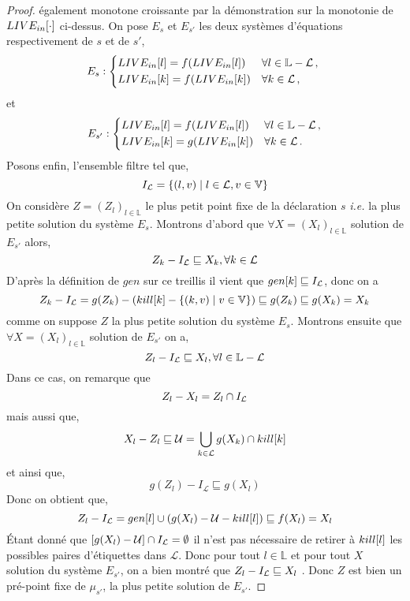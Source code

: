 \documentclass[a4paper, 12pt]{article}
\begin{document}
\begin{proof}
	également monotone croissante par la démonstration sur la monotonie de $LIVE_{in}[\cdot]$ ci-dessus.
	On pose $E_s$ et $E_{s'}$ les deux systèmes d'équations respectivement de $s$ et de $s'$,
	\[
	E_s :
	\begin{dcases*}
		\livein{l} = f(\livein{l}) &$\forall l \in \mathbb{L} - \mathcal{L}$\,, \\
		\livein{k} = f(\livein{k}) &$\forall k \in \mathcal{L}$\,,
	\end{dcases*}
	\]
	et
	\[
	E_{s'} :
	\begin{dcases*}
		\livein{l} = f(\livein{l}) &$\forall l \in \mathbb{L} - \mathcal{L}$\,,\\
		\livein{k} = g(\livein{k}) &$\forall k \in \mathcal{L}$\,.
	\end{dcases*}
	\]
	Posons enfin, l'ensemble filtre tel que,
	\[
		I_{\mathcal{L}} = \{(l, v) \mid l \in \mathcal{L}, v \in \mathbb{V}\}
	\]
	On considère $Z = (Z_l)_{l\in \mathbb{L}}$ le plus petit point fixe de la déclaration $s$ \textit{i.e.} la plus petite solution du système $E_s$.
	Montrons d'abord que $\forall X = (X_l)_{l\in \mathbb{L}}$ solution de $E_{s'}$ alors,
	\[Z_k - I_{\mathcal{L}} \sqsubseteq X_k, \forall k \in \mathcal{L}\]
	D'après la définition de $gen$ sur ce treillis il vient que $gen[k] \sqsubseteq I_{\mathcal{L}}$, donc on a
	\[Z_k - I_{\mathcal{L}} = g(Z_k) - (kill[k] - \{(k, v) \mid v \in \mathbb{V}\}) \sqsubseteq g(Z_k) \sqsubseteq g(X_k) = X_k\]
	comme on suppose $Z$ la plus petite solution du système $E_s$.
	Montrons ensuite que $\forall X = (X_l)_{l\in \mathbb{L}}$ solution de $E_{s'}$ on a,
	\[
		Z_l - I_{\mathcal{L}} \sqsubseteq X_l, \forall l \in \mathbb{L} - \mathcal{L}
	\]
	Dans ce cas, on remarque que 
	\[Z_l - X_l = Z_l \cap I_{\mathcal{L}}\] 
	mais aussi que, 
	\[X_l - Z_l \sqsubseteq \mathcal{U} = \bigcup\limits_{k\in \mathcal{L}} g(X_k) \cap kill[k]\]
	et ainsi que,
	\[g(Z_l) - I_{\mathcal{L}} \sqsubseteq g(X_l)\]
	Donc on obtient que,
	\[
		Z_l - I_{\mathcal{L}} = gen[l] \cup (g(X_l) - \mathcal{U} - kill[l]) \sqsubseteq f(X_l) = X_l
	\]
	Étant donné que $[g(X_l) - \mathcal{U}] \cap I_{\mathcal{L}} = \emptyset$ il n'est pas nécessaire de retirer à $kill[l]$ les possibles
	paires d'étiquettes dans $\mathcal{L}$.
	Donc pour tout $l \in \mathbb{L}$ et pour tout $X$ solution du système $E_{s'}$, on a bien montré que $Z_l - I_{\mathcal{L}} \sqsubseteq X_l$ .
	Donc $Z$ est bien un pré-point fixe de $\mu_{s'}$, la plus petite solution de $E_{s'}$.
\end{proof}
\end{document}
